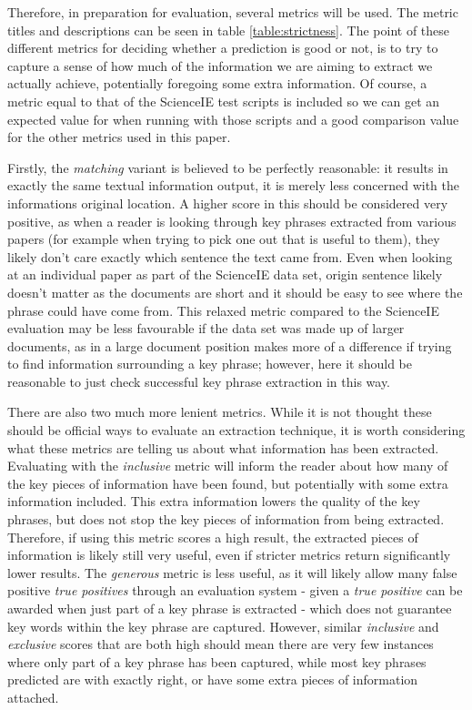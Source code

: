 Therefore, in preparation for evaluation, several metrics will be used. The metric titles and descriptions can be seen in table \ref{table:strictness}. The point of these different metrics for deciding whether a prediction is good or not, is to try to capture a sense of how much of the information we are aiming to extract we actually achieve, potentially foregoing some extra information. Of course, a metric equal to that of the ScienceIE test scripts is included so we can get an expected value for when running with those scripts and a good comparison value for the other metrics used in this paper.

Firstly, the \textit{matching} variant is believed to be perfectly reasonable: it results in exactly the same textual information output, it is merely less concerned with the informations original location. A higher score in this should be considered very positive, as when a reader is looking through key phrases extracted from various papers (for example when trying to pick one out that is useful to them), they likely don't care exactly which sentence the text came from. Even when looking at an individual paper as part of the ScienceIE data set, origin sentence likely doesn't matter as the documents are short and it should be easy to see where the phrase could have come from. This relaxed metric compared to the ScienceIE evaluation may be less favourable if the data set was made up of larger documents, as in a large document position makes more of a difference if trying to find information surrounding a key phrase; however, here it should be reasonable to just check successful key phrase extraction in this way.

There are also two much more lenient metrics. While it is not thought these should be official ways to evaluate an extraction technique, it is worth considering what these metrics are telling us about what information has been extracted. Evaluating with the \textit{inclusive} metric will inform the reader about how many of the key pieces of information have been found, but potentially with some extra information included. This extra information lowers the quality of the key phrases, but does not stop the key pieces of information from being extracted. Therefore, if using this metric scores a high result, the extracted pieces of information is likely still very useful, even if stricter metrics return significantly lower results. The \textit{generous} metric is less useful, as it will likely allow many false positive \textit{true positives} through an evaluation system - given a \textit{true positive} can be awarded when just part of a key phrase is extracted - which does not guarantee key words within the key phrase are captured. However, similar \textit{inclusive} and \textit{exclusive} scores that are both high should mean there are very few instances where only part of a key phrase has been captured, while most key phrases predicted are with exactly right, or have some extra pieces of information attached.

